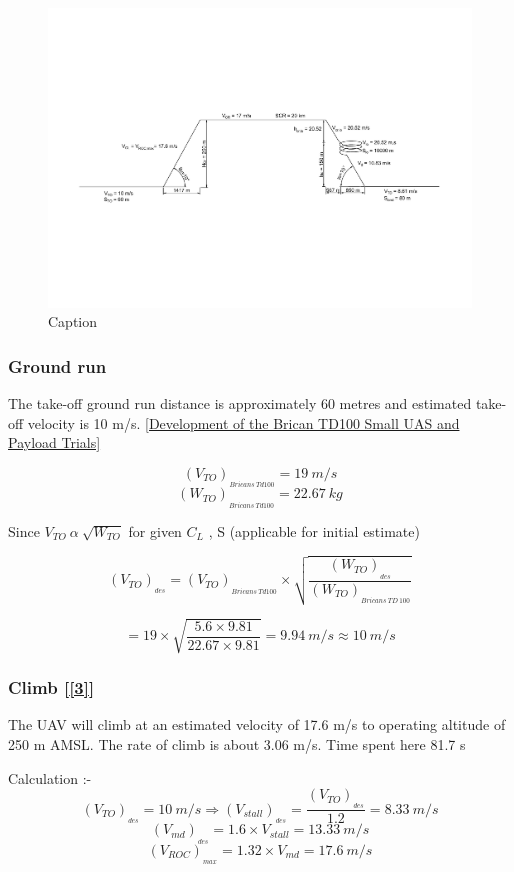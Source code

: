 \documentclass[12 pt]{article}
\begin{document}
\begin{figure}[h]
    \centering
    \includegraphics[width = \linewidth]{Drawing1-Model_final.pdf}
    \caption{Caption}
    \label{fig:enter-label}
\end{figure}


\subsubsection{Ground run}
The take-off ground run distance is approximately 60 metres and estimated take-off velocity is 10 m/s. \ref{Development of the Brican TD100 Small UAS and Payload Trials}

$$ (V_{TO})_{_{Bricans \: Td100}} = 19 \: m/s$$
$$ (W_{TO})_{_{Bricans \: Td100}} = 22.67 \: kg$$

Since $ V_{TO} \: \alpha \: \sqrt{W_{TO}} $ for given $C_L$ , S (applicable for initial estimate)

$$ (V_{TO})_{_{des}} = (V_{TO})_{_{Bricans \: Td100}} \times \sqrt{\frac{(W_{TO})_{_{des}}}{(W_{TO})_{_{Bricans \: TD \: 100}}}} $$

$$ = 19 \times \sqrt{\frac{5.6 \times 9.81}{22.67 \times 9.81}} = 9.94 \: m/s \approx 10 \: m/s $$

\subsubsection{Climb {[\ref{3}]} }
The UAV will climb at an estimated velocity of 17.6 m/s to operating altitude of 250 m AMSL. The rate of climb is about 3.06 m/s. Time spent here 81.7 s

Calculation :- 
$$ (V_{TO})_{_{des}} = 10 \: m/s \Rightarrow (V_{stall})_{_{des}} = \frac{(V_{TO})_{_{des}}}{1.2} = 8.33 \: m/s $$
$$ (V_{md})_{_{des}} = 1.6 \times V_{stall} = 13.33 \: m/s $$
$$ (V_{ROC})_{_{max}} = 1.32 \times V_{md} = 17.6 \: m/s $$
\end{document}
